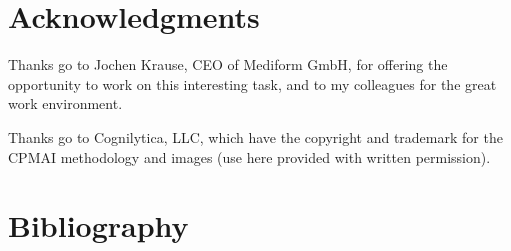 \documentclass[twocolumn]{article}
\begin{document}
\section{Acknowledgments}

Thanks go to Jochen Krause, CEO of Mediform GmbH, for offering the opportunity to work on this interesting task, and to my colleagues for the great work environment.

Thanks go to Cognilytica, LLC, which have the copyright and trademark for the CPMAI methodology and images (use here provided with written permission).


\section{Bibliography}


\end{document}

